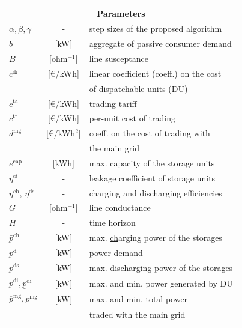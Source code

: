 \documentclass{IEEEtran}  %
\newcommand{\0}{\mathbf{0}}
\newcommand{\1}{\mathbf{1}}
\begin{document}
\smallskip
\begin{table}[!h]
	\small 
	\begin{tabular}{l c l}
				\toprule
		\multicolumn{3}{c}{Parameters} \\
		\hline
		$\alpha, \beta, \gamma$ &- & step sizes of the proposed algorithm \\
		$b$ & [kW]& aggregate of passive consumer demand \\
		$B$ &[ohm$^{-1}$] & line susceptance \\
		$ c^{\mathrm{di}}$ &[\euro/kWh] & linear coefficient (coeff.) on the cost \\ & & of dispatchable units (DU) \\
		$c^{\mathrm{ta}}$ & [\euro/kWh]& trading tariff \\
		$c^{\mathrm{tr}}$ &[\euro/kWh] & per-unit cost of trading \\
		$d^{\mathrm{mg}}$ & [\euro/kWh$^2$]& coeff. on the cost of trading with \\
		& & the main grid \\
		$e^{\mathrm{cap}}$ &[kWh] & max. capacity of the storage units \\
		{$\eta^{\mathrm{st}}$} & - & {leakage coefficient of storage units}\\
		{$ \eta^{\mathrm{ch}}$}, {$ \eta^{\mathrm{ds}}$} & - & {charging and discharging efficiencies}\\
		$G$ & [ohm$^{-1}$]  & line conductance \\
		$H$ &- & time horizon \\
		$\bar p^{\mathrm{ch}}$ &[kW]  & max. \underline{ch}arging power of the storages \\
		$p^{\mathrm{d}}$ &[kW]  & power \underline{d}emand 
		\\
		{$\bar p^{\mathrm{ds}}$} &[kW] & max. \underline{d}i\underline{s}c{h}arging power of the storages \\
		$\overline{p}^{\mathrm{di}}, \underline{p}^{\mathrm{di}}$ &[kW]  & max. and min. power generated by DU\\
		$\overline{p}^{\mathrm{mg}}, \underline{p}^{\mathrm{mg}}$ &[kW]  & max. and min. total power  \\ & & traded with the main grid\\

\end{tabular}
\end{table}
\end{document}
